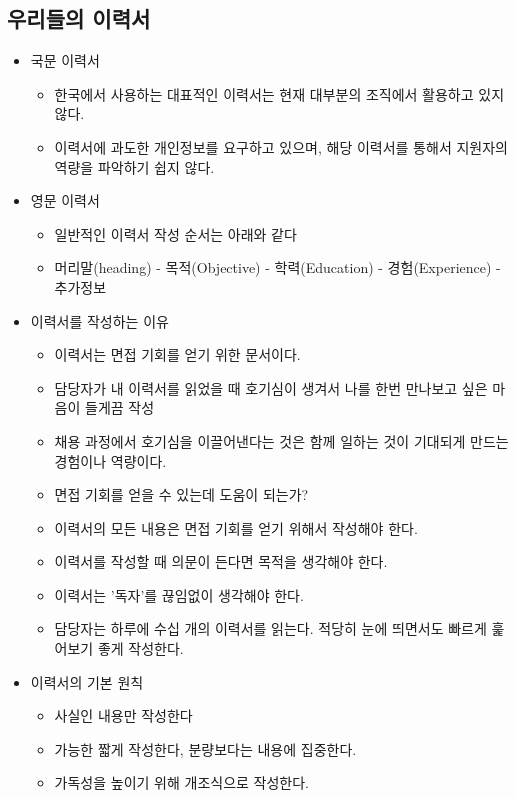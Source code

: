 \documentclass{article}
\begin{document}
\subsection{우리들의 이력서}
\begin{itemize}
    \item 국문 이력서
    \begin{itemize}
        \item 한국에서 사용하는 대표적인 이력서는 현재 대부분의 조직에서 활용하고 있지 않다.
        \item 이력서에 과도한 개인정보를 요구하고 있으며, 해당 이력서를 통해서 지원자의 역량을 파악하기 쉽지 않다.
    \end{itemize}
    \item 영문 이력서
    \begin{itemize}
        \item 일반적인 이력서 작성 순서는 아래와 같다
        \item 머리말(heading) - 목적(Objective) - 학력(Education) - 경험(Experience) - 추가정보
    \end{itemize}
    \item 이력서를 작성하는 이유
    \begin{itemize}
        \item 이력서는 면접 기회를 얻기 위한 문서이다.
        \item 담당자가 내 이력서를 읽었을 때 호기심이 생겨서 나를 한번 만나보고 싶은 마음이 들게끔 작성
        \item 채용 과정에서 호기심을 이끌어낸다는 것은 함께 일하는 것이 기대되게 만드는 경험이나 역량이다.
        \item 면접 기회를 얻을 수 있는데 도움이 되는가?
        \item 이력서의 모든 내용은 면접 기회를 얻기 위해서 작성해야 한다.
        \item 이력서를 작성할 때 의문이 든다면 목적을 생각해야 한다.
        \item 이력서는 '독자'를 끊임없이 생각해야 한다.
        \item 담당자는 하루에 수십 개의 이력서를 읽는다. 적당히 눈에 띄면서도 빠르게 훑어보기 좋게 작성한다.
    \end{itemize}
    \item 이력서의 기본 원칙
    \begin{itemize}
        \item 사실인 내용만 작성한다
        \item 가능한 짧게 작성한다, 분량보다는 내용에 집중한다.
        \item 가독성을 높이기 위해 개조식으로 작성한다.

\end{itemize}
\end{itemize}
\end{document}
